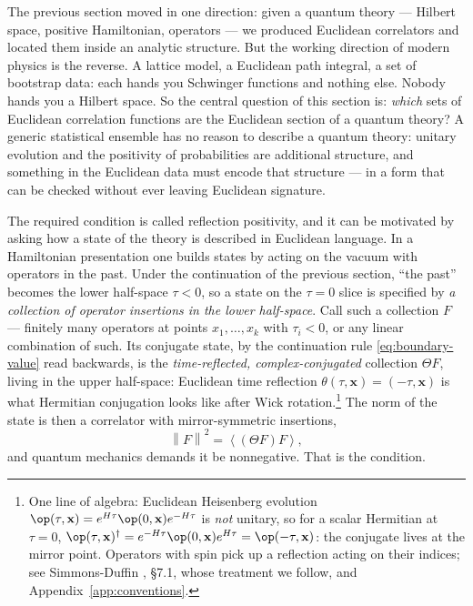The previous section moved in one direction: given a quantum theory ---
Hilbert space, positive Hamiltonian, operators --- we produced Euclidean
correlators and located them inside an analytic structure. But the working
direction of modern physics is the reverse. A lattice model, a Euclidean path
integral, a set of bootstrap data: each hands you Schwinger functions and
nothing else. Nobody hands you a Hilbert space. So the central question of
this section is: \emph{which} sets of
Euclidean correlation functions are the Euclidean section of a quantum
theory? A generic statistical ensemble has no reason to describe a quantum
theory: unitary evolution and the positivity of probabilities are additional
structure, and something in the Euclidean data must encode that structure ---
in a form that can be checked without ever leaving Euclidean signature.

The required condition is called reflection positivity, and it can be
motivated by asking how a state of the theory is described in Euclidean
language. In a Hamiltonian presentation one builds states by acting on the
vacuum with operators in the past. Under the continuation of the previous
section, ``the past'' becomes the lower half-space $\tau < 0$, so a state on
the $\tau = 0$ slice is specified by
\emph{a collection of operator insertions in the lower half-space}.
Call such a collection $F$ --- finitely many operators at points $x_1, \dots,
x_k$ with $\tau_i < 0$, or any linear combination of such. Its conjugate state,
by the continuation rule \eqref{eq:boundary-value} read backwards, is the
\emph{time-reflected, complex-conjugated} collection $\Theta F$, living in the
upper half-space: Euclidean time reflection $\theta(\tau, \mathbf{x}) = (-\tau,
\mathbf{x})$ is what Hermitian conjugation looks like after Wick
rotation.\footnote{One line of algebra: Euclidean Heisenberg evolution
$\op(\tau, \mathbf{x}) = e^{H\tau}\op(0,\mathbf{x})e^{-H\tau}$ is \emph{not}
unitary, so for a scalar Hermitian at $\tau = 0$,
$\op(\tau, \mathbf{x})^\dagger = e^{-H\tau}\op(0,\mathbf{x})e^{H\tau} =
\op(-\tau, \mathbf{x})$: the conjugate lives at the mirror point. Operators with
spin pick up a reflection acting on their indices; see Simmons-Duffin
, \S7.1, whose treatment we follow, and
Appendix~\ref{app:conventions}.} The norm of the state is then a correlator with
mirror-symmetric insertions,
\begin{equation}
\left\| F \right\|^2 = \left\langle (\Theta F) F \right\rangle ,
\label{eq:rp-norm}
\end{equation}
and quantum mechanics demands it be nonnegative. That is the condition.

